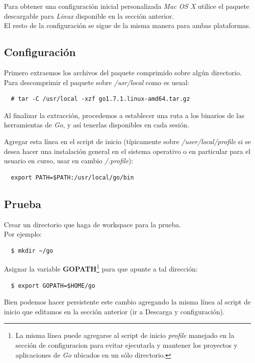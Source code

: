 \documentclass[12pt]{article}
\begin{document}
Para obtener una configuración inicial personalizada \textit{Mac OS X} utilice el paquete descargable para \textit{Linux} disponible en la sección anterior.\\

El resto de la configuración se sigue de la misma manera para ambas plataformas.

\subsection*{Configuración}
Primero extraemos los archivos del paquete comprimido sobre algún directorio.\\
Para descomprimir el paquete sobre \textit{/usr/local} como es usual:
\begin{verbatim}
  # tar -C /usr/local -xzf go1.7.1.linux-amd64.tar.gz
\end{verbatim}
Al finalizar la extracción, procedemos a establecer una ruta a los binarios de las herramientas de \textit{Go}, y así tenerlas disponibles en cada sesión.\par
Agregar esta línea en el script de inicio (típicamente sobre \textit{/user/local/profile}
si se desea hacer una instalación general en el sistema operativo o
en particular para el usuario en curso, usar en cambio \textit{/.profile}):
\begin{verbatim}
  export PATH=$PATH:/usr/local/go/bin
\end{verbatim}

\subsection*{Prueba}
Crear un directorio que haga de workspace para la prueba.\\
Por ejemplo:
\begin{verbatim}
  $ mkdir ~/go
\end{verbatim}
Asignar la variable \textbf{GOPATH}\footnote{La misma línea puede agregarse al script de inicio \textit{profile} manejado en la sección de configuracion para evitar ejecutarla y mantener los proyectos y aplicaciones de \textit{Go} ubicados en un sólo directorio.}
para que apunte a tal dirección:
\begin{verbatim}
  $ export GOPATH=$HOME/go
\end{verbatim}
Bien podemos hacer persistente este cambio agregando la misma línea al script
de inicio que editamos en la sección anterior (ir a Descarga y configuración). \par
\end{document}
